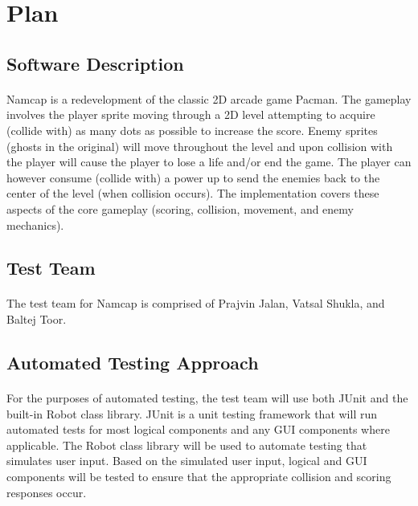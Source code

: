 \documentclass[12pt, titlepage]{article}
\begin{document}
\section{Plan}
	
\subsection{Software Description}
\paragraph{}
Namcap is a redevelopment of the classic 2D arcade game Pacman. The gameplay involves the player sprite moving through a 2D level attempting to acquire (collide with) as many dots as possible to increase the score. Enemy sprites (ghosts in the original) will move throughout the level and upon collision with the player will cause the player to lose a life and/or end the game. The player can however consume (collide with) a power up to send the enemies back to the center of the level (when collision occurs). The implementation covers these aspects of the core gameplay (scoring, collision, movement, and enemy mechanics).

\subsection{Test Team}
\paragraph{}
The test team for Namcap is comprised of Prajvin Jalan, Vatsal Shukla, and Baltej Toor.

\subsection{Automated Testing Approach}
\paragraph{}
For the purposes of automated testing, the test team will use both JUnit and the built-in Robot class library. JUnit is a unit testing framework that will run automated tests for most logical components and any GUI components where applicable. The Robot class library will be used to automate testing that simulates user input. Based on the simulated user input, logical and GUI components will be tested to ensure that the appropriate collision and scoring responses occur.
\end{document}
